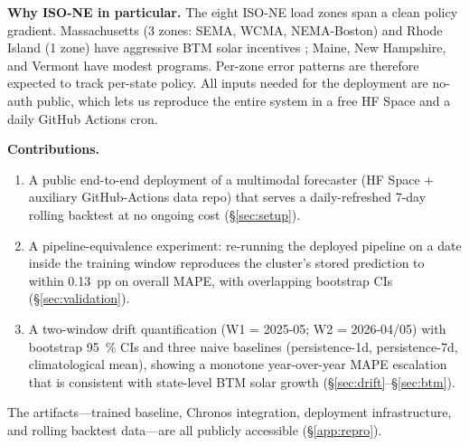 \textbf{Why ISO-NE in particular.} The eight ISO-NE load zones span a
clean policy gradient. Massachusetts (3 zones: SEMA, WCMA, NEMA-Boston)
and Rhode Island (1 zone) have aggressive BTM solar incentives
\citep{ma2024smart,ri2024reg}; Maine, New Hampshire, and Vermont have
modest programs. Per-zone error patterns are therefore expected to
track per-state policy. All inputs needed for the deployment are
no-auth public, which lets us reproduce the entire system in a free HF
Space and a daily GitHub Actions cron.

\textbf{Contributions.}
\begin{enumerate}\setlength\itemsep{1pt}
    \item A public end-to-end deployment of a multimodal forecaster
    (HF Space + auxiliary GitHub-Actions data repo) that serves a
    daily-refreshed 7-day rolling backtest at no ongoing cost
    (§\ref{sec:setup}).
    \item A pipeline-equivalence experiment: re-running the deployed
    pipeline on a date inside the training window reproduces the
    cluster's stored prediction to within 0.13~pp on overall MAPE, with
    overlapping bootstrap CIs (§\ref{sec:validation}).
    \item A two-window drift quantification (W1 = 2025-05;
    W2 = 2026-04/05) with bootstrap 95~\% CIs and three naive baselines
    (persistence-1d, persistence-7d, climatological mean), showing a
    monotone year-over-year MAPE escalation that is consistent with
    state-level BTM solar growth (§\ref{sec:drift}--§\ref{sec:btm}).
\end{enumerate}

The artifacts---trained baseline, Chronos integration, deployment
infrastructure, and rolling backtest data---are all publicly accessible
(§\ref{app:repro}).
